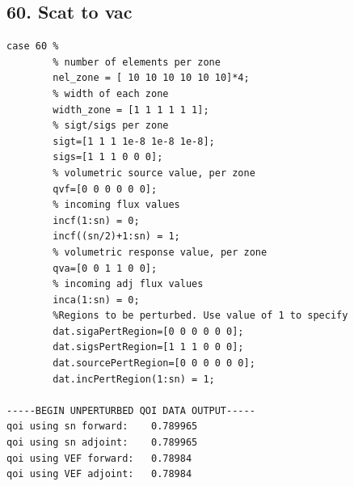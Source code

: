 \documentclass{article}
\begin{document}
\subsection{60. Scat to vac}
\begin{verbatim}
case 60 %
        % number of elements per zone
        nel_zone = [ 10 10 10 10 10 10]*4;
        % width of each zone
        width_zone = [1 1 1 1 1 1];
        % sigt/sigs per zone
        sigt=[1 1 1 1e-8 1e-8 1e-8];
        sigs=[1 1 1 0 0 0];
        % volumetric source value, per zone
        qvf=[0 0 0 0 0 0];
        % incoming flux values
        incf(1:sn) = 0;
        incf((sn/2)+1:sn) = 1;
        % volumetric response value, per zone
        qva=[0 0 1 1 0 0];
        % incoming adj flux values
        inca(1:sn) = 0;
        %Regions to be perturbed. Use value of 1 to specify
        dat.sigaPertRegion=[0 0 0 0 0 0];
        dat.sigsPertRegion=[1 1 1 0 0 0];
        dat.sourcePertRegion=[0 0 0 0 0 0];
        dat.incPertRegion(1:sn) = 1;
        
-----BEGIN UNPERTURBED QOI DATA OUTPUT----- 
qoi using sn forward: 	 0.789965 
qoi using sn adjoint: 	 0.789965 
qoi using VEF forward: 	 0.78984 
qoi using VEF adjoint: 	 0.78984 
\end{verbatim}
\end{document}
